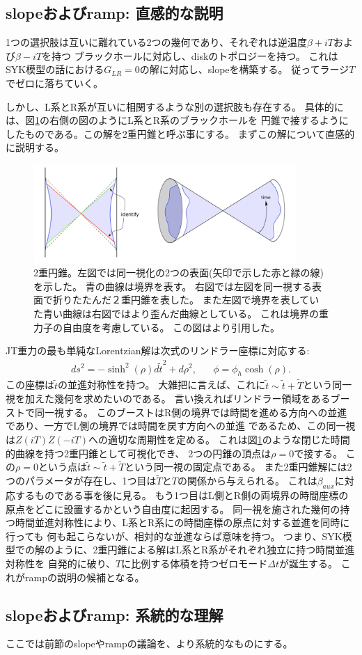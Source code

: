 \subsection{slopeおよびramp: 直感的な説明}
1つの選択肢は互いに離れている2つの幾何であり、それぞれは逆温度$\beta + iT$および$\beta - iT$を持つ
ブラックホールに対応し、diskのトポロジーを持つ。
これはSYK模型の話における$G_{LR} = 0$の解に対応し、slopeを構築する。
従ってラージ$T$でゼロに落ちていく。

しかし、L系とR系が互いに相関するような別の選択肢も存在する。
具体的には、図\ref{fig:double_cone}の右側の図のようにL系とR系のブラックホールを
円錐で接するようにしたものである。この解を2重円錐と呼ぶ事にする。
まずこの解について直感的に説明する。

\begin{figure}[ht]
	\centering
	\includegraphics[width=10cm]{figures/double_cone}
	\caption{
	2重円錐。左図では同一視化の2つの表面(矢印で示した赤と緑の線)を示した。
	青の曲線は境界を表す。
	右図では左図を同一視する表面で折りたたんだ２重円錐を表した。
	また左図で境界を表していた青い曲線は右図ではより歪んだ曲線としている。
	これは境界の重力子の自由度を考慮している。
	この図は\cite{polchinski_chaos}より引用した。}
	\label{fig:double_cone}
\end{figure}

JT重力の最も単純なLorentzian解は次式のリンドラー座標に対応する:
\begin{align}
	ds^2 = -\sinh^2(\rho)d\tilde{t}^2 + d\rho^2,\hspace{20pt}
	\phi = \phi_h\cosh(\rho).
\end{align}
この座標は$\tilde{t}$の並進対称性を持つ。
大雑把に言えば、これに$\tilde{t}\sim\tilde{t}+\tilde{T}$という同一視を加えた幾何を求めたいのである。
言い換えればリンドラー領域をあるブーストで同一視する。
このブーストはR側の境界では時間を進める方向への並進であり、一方でL側の境界では時間を戻す方向への並進
であるため、この同一視は$Z(iT)Z(-iT)$への適切な周期性を定める。
これは図\ref{fig:double_cone}のような閉じた時間的曲線を持つ2重円錐として可視化でき、
2つの円錐の頂点は$\rho = 0$で接する。
この$\rho = 0$という点は$\tilde{t}\sim\tilde{t}+\tilde{T}$という同一視の固定点である。
また2重円錐解には2つのパラメータが存在し、1つ目は$\tilde{T}$と$T$の関係から与えられる。
これは$\beta_{aux}$に対応するものである事を後に見る。
もう1つ目はL側とR側の両境界の時間座標の原点をどこに設置するかという自由度に起因する。
同一視を施された幾何の持つ時間並進対称性により、L系とR系にの時間座標の原点に対する並進を同時に行っても
何も起こらないが、相対的な並進ならば意味を持つ。
つまり、SYK模型での解のように、2重円錐による解はL系とR系がそれぞれ独立に持つ時間並進対称性を
自発的に破り、$T$に比例する体積を持つゼロモード$\Delta t$が誕生する。
これがrampの説明の候補となる。

\subsection{slopeおよびramp: 系統的な理解}
ここでは前節のslopeやrampの議論を、より系統的なものにする。


\pagebreak
